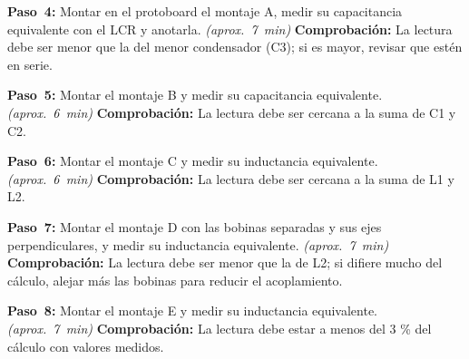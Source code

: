 \documentclass[12pt]{article}
\begin{document}
\begin{pasos}
  \item \textbf{Paso~4:} Montar en el protoboard el montaje A, medir su capacitancia equivalente con el LCR y anotarla. \emph{(aprox.~\SI{7}{\minute})} \textbf{Comprobación:} La lectura debe ser menor que la del menor condensador (C3); si es mayor, revisar que estén en serie.
  \item \textbf{Paso~5:} Montar el montaje B y medir su capacitancia equivalente. \emph{(aprox.~\SI{6}{\minute})} \textbf{Comprobación:} La lectura debe ser cercana a la suma de C1 y C2.
  \item \textbf{Paso~6:} Montar el montaje C y medir su inductancia equivalente. \emph{(aprox.~\SI{6}{\minute})} \textbf{Comprobación:} La lectura debe ser cercana a la suma de L1 y L2.
  \item \textbf{Paso~7:} Montar el montaje D con las bobinas separadas y sus ejes perpendiculares, y medir su inductancia equivalente. \emph{(aprox.~\SI{7}{\minute})} \textbf{Comprobación:} La lectura debe ser menor que la de L2; si difiere mucho del cálculo, alejar más las bobinas para reducir el acoplamiento.
  \item \textbf{Paso~8:} Montar el montaje E y medir su inductancia equivalente. \emph{(aprox.~\SI{7}{\minute})} \textbf{Comprobación:} La lectura debe estar a menos del 3 \% del cálculo con valores medidos.
\end{pasos}
\end{document}
